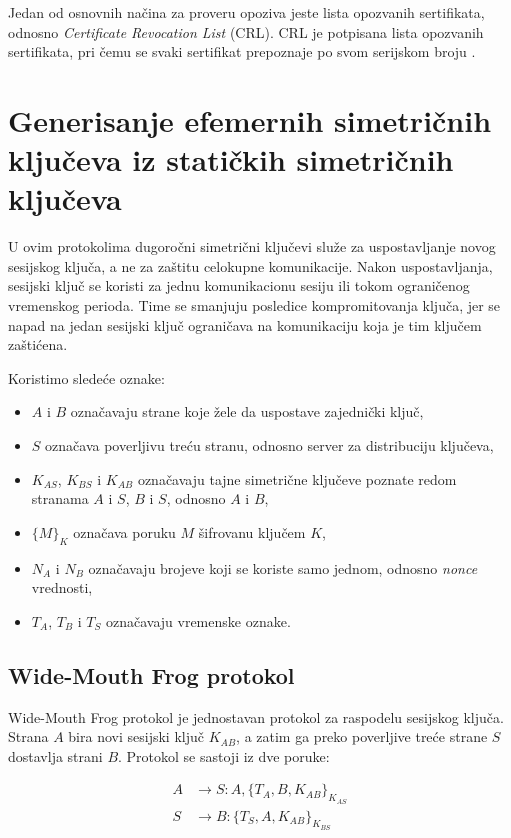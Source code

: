 Jedan od osnovnih načina za proveru opoziva jeste lista opozvanih sertifikata, odnosno \emph{Certificate Revocation List} (CRL). CRL je potpisana lista opozvanih sertifikata, pri čemu se svaki sertifikat prepoznaje po svom serijskom broju \cite{rfc5280}.

\section{Generisanje efemernih simetričnih ključeva iz statičkih simetričnih ključeva}

U ovim protokolima dugoročni simetrični ključevi služe za uspostavljanje novog sesijskog ključa, a ne za zaštitu celokupne komunikacije. Nakon uspostavljanja, sesijski ključ se koristi za jednu komunikacionu sesiju ili tokom ograničenog vremenskog perioda. Time se smanjuju posledice kompromitovanja ključa, jer se napad na jedan sesijski ključ ograničava na komunikaciju koja je tim ključem zaštićena.

Koristimo sledeće oznake:
\begin{itemize}
\item \(A\) i \(B\) označavaju strane koje žele da uspostave zajednički ključ,
\item \(S\) označava poverljivu treću stranu, odnosno server za distribuciju ključeva,
\item \(K_{AS}\), \(K_{BS}\) i \(K_{AB}\) označavaju tajne simetrične ključeve poznate redom stranama \(A\) i \(S\), \(B\) i \(S\), odnosno \(A\) i \(B\),
\item \(\{M\}_{K}\) označava poruku \(M\) šifrovanu ključem \(K\),
\item \(N_A\) i \(N_B\) označavaju brojeve koji se koriste samo jednom, odnosno \emph{nonce} vrednosti,
\item \(T_A\), \(T_B\) i \(T_S\) označavaju vremenske oznake\cite{smart2016cryptography}.
\end{itemize}

\subsection{Wide-Mouth Frog protokol}

Wide-Mouth Frog protokol je jednostavan protokol za raspodelu sesijskog ključa. Strana \(A\) bira novi sesijski ključ \(K_{AB}\), a zatim ga preko poverljive treće strane \(S\) dostavlja strani \(B\). Protokol se sastoji iz dve poruke:

\[ \begin{aligned} A &\rightarrow S : A, \{T_A, B, K_{AB}\}_{K_{AS}} \\ S &\rightarrow B : \{T_S, A, K_{AB}\}_{K_{BS}} \end{aligned} \]

